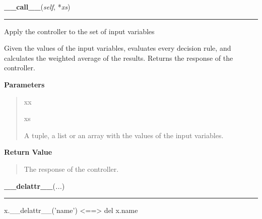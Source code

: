     \begin{boxedminipage}{\textwidth}

    \raggedright \textbf{\_\_call\_\_}(\textit{self}, *\textit{xs})

    \vspace{-1.5ex}

    \rule{\textwidth}{0.5\fboxrule}

Apply the controller to the set of input variables

Given the values of the input variables, evaluates every decision rule,
and calculates the weighted average of the results. Returns the response
of the controller.
    \vspace{1ex}

      \textbf{Parameters}
      \begin{quote}
        \begin{Ventry}{xx}

          \item[xs]


A tuple, a list or an array with the values of the input variables.
        \end{Ventry}

      \end{quote}

    \vspace{1ex}

      \textbf{Return Value}
      \begin{quote}

The response of the controller.
      \end{quote}

    \vspace{1ex}

    \end{boxedminipage}

    \label{object:__delattr__}

    \vspace{0.5ex}

    \begin{boxedminipage}{\textwidth}

    \raggedright \textbf{\_\_delattr\_\_}(\textit{...})

    \vspace{-1.5ex}

    \rule{\textwidth}{0.5\fboxrule}

x.{\_}{\_}delattr{\_}{\_}('name') {\textless}=={\textgreater} del x.name
    \vspace{1ex}

    \end{boxedminipage}

